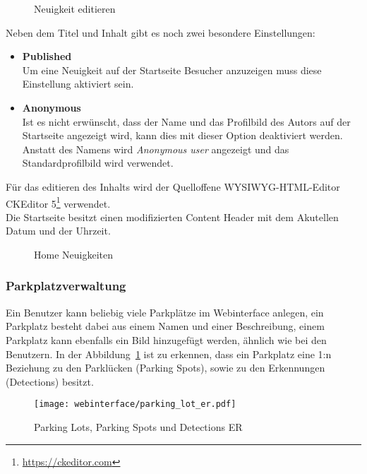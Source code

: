 \begin{figure}[H]
  \centering
  \caption{Neuigkeit editieren}
\end{figure}

Neben dem Titel und Inhalt gibt es noch zwei besondere Einstellungen:

\begin{itemize}
  \item \textbf{Published}\\
  Um eine Neuigkeit auf der Startseite Besucher anzuzeigen muss diese
  Einstellung aktiviert sein. 
  \item \textbf{Anonymous}\\
  Ist es nicht erwünscht, dass der Name und das Profilbild des Autors auf der
  Startseite angezeigt wird, kann dies mit dieser Option deaktiviert werden.
  Anstatt des Namens wird \textit{Anonymous user} angezeigt und das
  Standardprofilbild wird verwendet.
\end{itemize}

Für das editieren des Inhalts wird der Quelloffene \acs*{WYSIWYG}-HTML-Editor
CKEditor 5\footnote{\url{https://ckeditor.com}} verwendet.\\

Die Startseite besitzt einen modifizierten Content Header mit dem Akutellen
Datum und der Uhrzeit.

\begin{figure}[H]
  \centering
  \caption{Home Neuigkeiten}
\end{figure}

\subsubsection{Parkplatzverwaltung}
Ein Benutzer kann beliebig viele Parkplätze im Webinterface anlegen, ein
Parkplatz besteht dabei aus einem Namen und einer Beschreibung, einem Parkplatz
kann ebenfalls ein Bild hinzugefügt werden, ähnlich wie bei den Benutzern. In der
Abbildung~\ref{fig:parking_lot_er} ist zu erkennen, dass ein Parkplatz eine 1:n
Beziehung zu den Parklücken (Parking Spots), sowie zu den Erkennungen
(Detections) besitzt. 

\begin{figure}[H]
  \centering
  \texttt{[image: webinterface/parking\_lot\_er.pdf]}
  \caption{Parking Lots, Parking Spots und Detections ER}
  \label{fig:parking_lot_er}
\end{figure}

